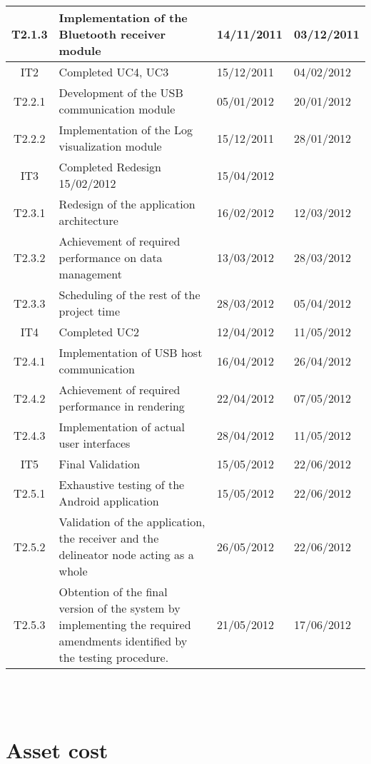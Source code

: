 \begin{tabular}{| c | p{6cm} | l | l |} %
\hline
   T2.1.3 & Implementation of the Bluetooth receiver module & 14/11/2011 & 03/12/2011\\ \hline
IT2 & Completed UC4, UC3 & 15/12/2011 & 04/02/2012\\ \hline
   T2.2.1 & Development of the USB communication module & 05/01/2012 & 20/01/2012\\ \hline
   T2.2.2 & Implementation of the Log visualization module & 15/12/2011 & 28/01/2012\\ \hline
IT3 & Completed Redesign	15/02/2012 & 15/04/2012\\ \hline
   T2.3.1 & Redesign of the application architecture & 16/02/2012 & 12/03/2012\\ \hline
   T2.3.2 & Achievement of required performance on data management & 13/03/2012 & 28/03/2012\\ \hline
   T2.3.3 & Scheduling of the rest of the project time & 28/03/2012 & 05/04/2012\\ \hline
IT4 & Completed UC2 & 12/04/2012 & 11/05/2012\\ \hline
   T2.4.1 & Implementation of USB host communication & 16/04/2012 & 26/04/2012\\ \hline
   T2.4.2 & Achievement of required performance in rendering & 22/04/2012 & 07/05/2012\\ \hline
   T2.4.3 & Implementation of actual user interfaces & 28/04/2012 & 11/05/2012\\ \hline
IT5 & Final Validation & 15/05/2012 & 22/06/2012\\ \hline
   T2.5.1 & Exhaustive testing of the Android application & 15/05/2012 & 22/06/2012\\ \hline
   T2.5.2 & Validation of the application, the receiver and the delineator node acting as a whole & 26/05/2012 & 22/06/2012\\ \hline
   T2.5.3 & Obtention of the final version of the system by implementing the required amendments identified by the testing procedure. & 21/05/2012 & 17/06/2012\\
\hline
\end{tabular}\\\\


\section{Asset cost}

